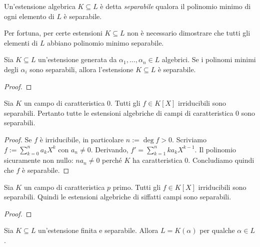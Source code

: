 \begin{defi}
Un'estensione algebrica \(K \subseteq L\) è detta {\em separabile} qualora il polinomio minimo di ogni elemento di \(L\) è separabile.
\end{defi}

Per fortuna, per certe estensioni \(K \subseteq L\) non è necessario dimostrare che tutti gli elementi di \(L\) abbiano polinomio minimo separabile.

\begin{prop}
Sia \(K \subseteq L\) un'estensione generata da \(\alpha_1, \dots{}, \alpha_n \in L\) algebrici. Se i polinomi minimi degli \(\alpha_i\) sono separabili, allora l'estensione \(K \subseteq L\) è separabile.
\end{prop}

\begin{proof}
\end{proof}

\begin{defi}
\end{defi}

\begin{prop}
Sia \(K\) un campo di caratteristica \(0\). Tutti gli \(f \in K[X]\) irriducibili sono separabili. Pertanto tutte le estensioni algebriche di campi di caratteristica \(0\) sono separabili. 
\end{prop}

\begin{proof}
Se \(f\) è irriducibile, in particolare \(n:=\deg f >0\). Scriviamo \(f := \sum_{k = 0}^n a_kX^k\) con \(a_n \ne 0\). Derivando, \(f' = \sum_{k=1}^n ka_kX^{k-1}\). Il polinomio sicuramente non nullo: \(n a_n \ne 0\) perché \(K\) ha caratteristica \(0\). Concludiamo quindi che \(f\) è separabile.
\end{proof}

\begin{prop}
Sia \(K\) un campo di caratteristica \(p\) primo. Tutti gli \(f \in K[X]\) irriducibili sono separabili. Quindi le estensioni algebriche di siffatti campi sono separabili. 
\end{prop}

\begin{proof}
\end{proof}

\begin{teor}\label{teor:ElementoPrimitivo}
Sia \(K \subseteq L\) un'estensione finita e separabile. Allora \(L = K(\alpha)\) per qualche \(\alpha \in L\). 
\end{teor}


